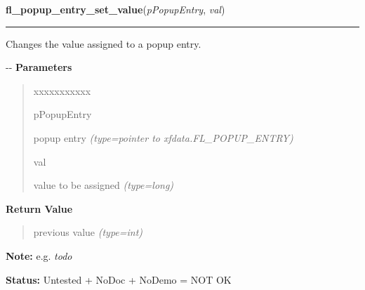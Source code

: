 \hspace{.8\funcindent}\begin{boxedminipage}{\funcwidth}

    \raggedright \textbf{fl\_popup\_entry\_set\_value}(\textit{pPopupEntry}, \textit{val})

    \vspace{-1.5ex}

    \rule{\textwidth}{0.5\fboxrule}
\setlength{\parskip}{2ex}

Changes the value assigned to a popup entry.

-{}-
\setlength{\parskip}{1ex}
      \textbf{Parameters}
      \vspace{-1ex}

      \begin{quote}
        \begin{Ventry}{xxxxxxxxxxx}

          \item[pPopupEntry]


popup entry
            {\it (type=pointer to xfdata.FL\_POPUP\_ENTRY)}

          \item[val]


value to be assigned
            {\it (type=long)}

        \end{Ventry}

      \end{quote}

      \textbf{Return Value}
    \vspace{-1ex}

      \begin{quote}

previous value
      {\it (type=int)}

      \end{quote}

\textbf{Note:} 
e.g. \emph{todo}


\textbf{Status:} 
Untested + NoDoc + NoDemo = NOT OK


    \end{boxedminipage}

    \label{xformslib:flpopup:fl_popup_entry_set_user_data}

    \vspace{0.5ex}

